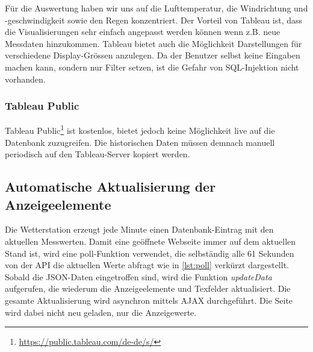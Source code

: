 Für die Auswertung haben wir uns auf die Lufttemperatur, die Windrichtung und -geschwindigkeit sowie den Regen konzentriert.
Der Vorteil von Tableau ist, dass die Visualisierungen sehr einfach angepasst werden können wenn z.B. neue Messdaten hinzukommen. Tableau bietet auch die Möglichkeit Darstellungen für verschiedene Display-Grössen anzulegen. Da der Benutzer selbst keine Eingaben machen kann, sondern nur Filter setzen, ist die Gefahr von SQL-Injektion nicht vorhanden.


\subsubsection{Tableau Public}
\newline

Tableau Public\footnote{ \url{https://public.tableau.com/de-de/s/}} ist kostenlos, bietet jedoch keine Möglichkeit live auf die Datenbank zuzugreifen. Die historischen Daten müssen demnach manuell periodisch auf den Tableau-Server kopiert werden.\newline

\newline
{}\newline
{}\newline

\newline
{}\newline





\subsection{Automatische Aktualisierung der Anzeigeelemente}
Die Wetterstation erzeugt jede Minute einen Datenbank-Eintrag mit den aktuellen Messwerten. Damit eine geöffnete Webseite immer auf dem aktuellen Stand ist, wird eine poll-Funktion verwendet, die selbständig alle 61 Sekunden von der API die aktuellen Werte abfragt wie in \ref{lst:poll} verkürzt dargestellt. Sobald die JSON-Daten eingetroffen sind, wird die Funktion \textit{updateData} aufgerufen, die wiederum die Anzeigeelemente und Texfelder aktualisiert. Die gesamte Aktualisierung wird asynchron mittels AJAX durchgeführt. Die Seite wird dabei nicht neu geladen, nur die Anzeigewerte. \newline



